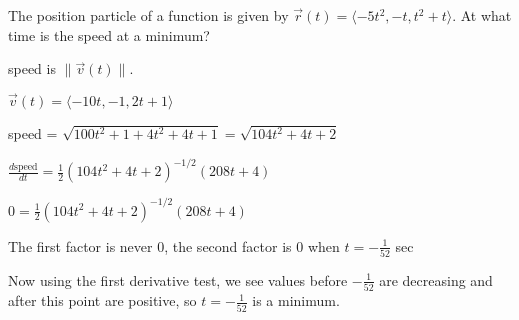 \documentclass[../calc3.tex]{subfiles}
\begin{document}
\begin{example}
    The position particle of a function is given by $\vec{r}(t)=\langle -5t^2, -t,t^2+t\rangle$. At what time is the speed at a minimum?

    speed is $\| \vec{v}(t)\|$.

    $\vec{v}(t)=\langle -10t, -1, 2t+1\rangle$

    speed = $\sqrt{100t^2+1+4t^2+4t+1}=\sqrt{104t^2+4t+2}$

    $\frac{d\text{speed}}{dt}=\frac{1}{2}(104t^2+4t+2)^{-1/2}(208t+4)$

    $0=\frac{1}{2}(104t^2+4t+2)^{-1/2}(208t+4)$

    The first factor is never $0$, the second factor is $0$ when $t=-\frac{1}{52}$ sec 

    Now using the first derivative test, we see values before $-\frac{1}{52}$ are decreasing and after this point are positive, so $t=-\frac{1}{52}$ is a minimum.
\end{example}
\end{document}

